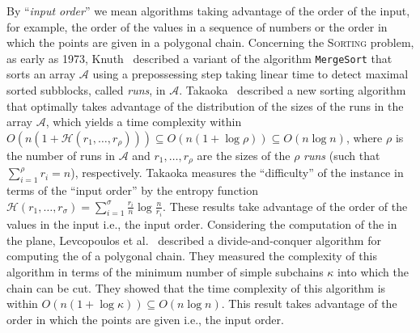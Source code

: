 By ``\emph{input order}'' we mean algorithms taking advantage of the
order of the input, for example, the order of the values in a sequence
of numbers or the order in which the points are given in a
polygonal chain.
Concerning the \textsc{Sorting} problem, as early as 1973,
Knuth~\cite{1973-BOOK-TheArtOfComputerProgrammingVol3-Knuth} described
a variant of the algorithm {\tt{MergeSort}} that sorts an array
$\mathcal{A}$ using a prepossessing step taking linear time to detect
maximal sorted subblocks, called \emph{runs}, in $\mathcal{A}$.
Takaoka~\cite{2009-Chapter-PartialSolutionAndEntropy-Takaoka}
described a new sorting algorithm that optimally takes advantage of
the distribution of the sizes of the runs in the array $\mathcal{A}$,
which yields a time complexity within
$O(n(1+\mathcal{H}(r_1, \dots, r_{\rho}))) \subseteq
O(n(1{+}\log{\rho})) \subseteq O(n\log{n})$, where $\rho$ is the
number of runs in $\mathcal{A}$ and $r_1, \dots, r_{\rho}$ are the
sizes of the $\rho$ \emph{runs} (such that $\sum_{i=1}^\rho {r_i}=n$),
respectively. Takaoka measures the ``difficulty'' of the instance in
terms of the ``input order'' by the entropy function
$\mathcal{H}(r_1, \dots, r_\sigma) =
\sum_{i=1}^\sigma{\frac{r_i}{n}}\log{\frac{n}{r_i}}$. These results
take advantage of the order of the values in the input i.e., the input
order.
Considering the computation of the {} in the plane,
Levcopoulos et
al.~\cite{2002-SWAT-AdaptiveAlgorithmsForConstructingConvexHullsAndTriangulationsOfPolygonalChains-LevcopoulosLingasMitchell}
described a divide-and-conquer algorithm for computing the {} of a polygonal chain. They measured the complexity of this
algorithm in terms of the minimum number of simple subchains $\kappa$
into which the chain can be cut.  They showed that the time complexity
of this algorithm is within
$O(n(1{+}\log{\kappa})) \subseteq O(n\log{n})$. This result takes
advantage of the order in which the points are given i.e., the input
order.


